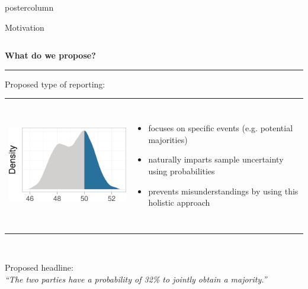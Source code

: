 \documentclass[final,hyperref={pdfpagelabels=false}]{beamer}
\let\olditem\item
\renewcommand\item{\justifying\olditem} %
\newcommand{\bfBlue}[1]{\textcolor{koaladarkestblue}{\textbf{#1}}}
\newcommand{\blue}[1]{\textcolor{koaladarkestblue}{#1}}
\newcommand{\darkgray}[1]{\textcolor{koaladarkgray}{#1}}
\newcommand{\lightgray}[1]{\textcolor{koalagray}{#1}}
\newcommand{\colHeader}[1]{
  \vspace{-3ex}
  \begin{center}\centering
  \bfBlue{#1}
  \end{center}
  \vspace{-2ex}
  \textcolor{koalablue}{\hrule{}}
  \vspace{2ex}
}
\begin{document}
\begin{frame}
\begin{columns}
\begin{column}{1\textwidth}
\begin{beamercolorbox}[center,wd=\textwidth]{postercolumn}
\begin{minipage}[T]{.95\textwidth}
\begin{block}{\footnotesize Motivation}
\begin{columns}[t]

  \begin{column}{.475\textwidth}
  \colHeader{What do we propose?}
  Proposed type of reporting: \\[1cm]
  \begin{tabular}{p{9cm}p{25cm}}
  \includegraphics[height=5.75cm]{figures/motivation_density_highlighted}
  &
  \vspace{-5.3cm}
  \begin{itemize}
    \item focuses on specific events (e.g. potential majorities)
    \item naturally imparts sample uncertainty using probabilities
    \item prevents misunderstandings by using this holistic approach
  \end{itemize}
  \end{tabular}
  \\[10px]
  \begin{mdleftblue}
  \begin{minipage}{\textwidth}
  \lightgray{\footnotesize Proposed headline:}
  \\
  \vspace{-50px}
  \textit{\darkgray{``The two parties have a} \blue{probability of 32\%} \darkgray{to jointly obtain a majority.''}}
  \\[17px]
  \end{minipage}
  \end{mdleftblue}
  \vspace{60px}


\end{column}
\end{columns}
\end{block}
\end{minipage}
\end{beamercolorbox}
\end{column}
\end{columns}
\end{frame}
\end{document}
